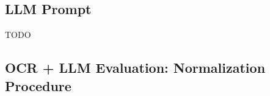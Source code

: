 \documentclass[11pt]{article}
\begin{document}
    


\subsection{LLM Prompt}
TODO

\subsection{OCR + LLM Evaluation: Normalization Procedure}


\end{document}

